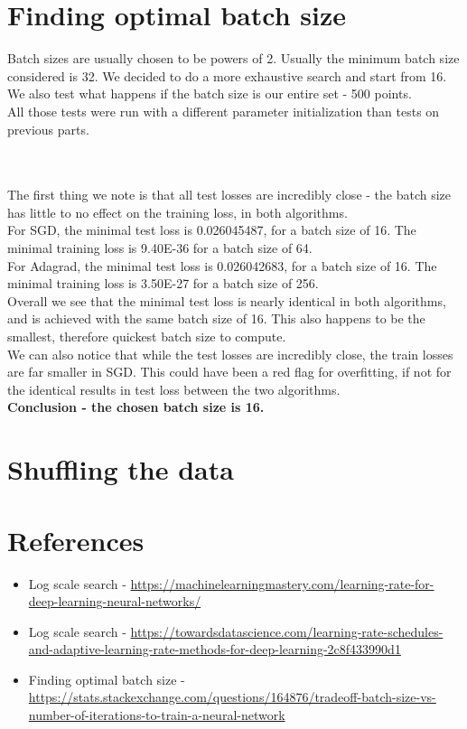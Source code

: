 \documentclass[12pt]{scrartcl}
\begin{document}
\section{Finding optimal batch size}
Batch sizes are usually chosen to be powers of 2. Usually the minimum batch size considered is 32. We decided to do a more exhaustive search and start from 16. We also test what happens if the batch size is our entire set - 500 points.\\
All those tests were run with a different parameter initialization than tests on previous parts.

\\\\

The first thing we note is that all test losses are incredibly close - the batch size has little to no effect on the training loss, in both algorithms.\\
For SGD, the minimal test loss is 0.026045487, for a batch size of 16. The minimal training loss is 9.40E-36 for a batch size of 64.\\
For Adagrad, the minimal test loss is 0.026042683, for a batch size of 16. The minimal training loss is 3.50E-27 for a batch size of 256.\\
Overall we see that the minimal test loss is nearly identical in both algorithms, and is achieved with the same batch size of 16. This also happens to be the smallest, therefore quickest batch size to compute.\\
We can also notice that while the test losses are incredibly close, the train losses are far smaller in SGD. This could have been a red flag for overfitting, if not for the identical results in test loss between the two algorithms.\\
\textbf{Conclusion - the chosen batch size is 16.}

\section{Shuffling the data}

\section{References}
\begin{itemize}
\item Log scale search - \url{https://machinelearningmastery.com/learning-rate-for-deep-learning-neural-networks/}

\item Log scale search - \url{https://towardsdatascience.com/learning-rate-schedules-and-adaptive-learning-rate-methods-for-deep-learning-2c8f433990d1}

\item Finding optimal batch size - \url{https://stats.stackexchange.com/questions/164876/tradeoff-batch-size-vs-number-of-iterations-to-train-a-neural-network}
\end{itemize}
\end{document}
